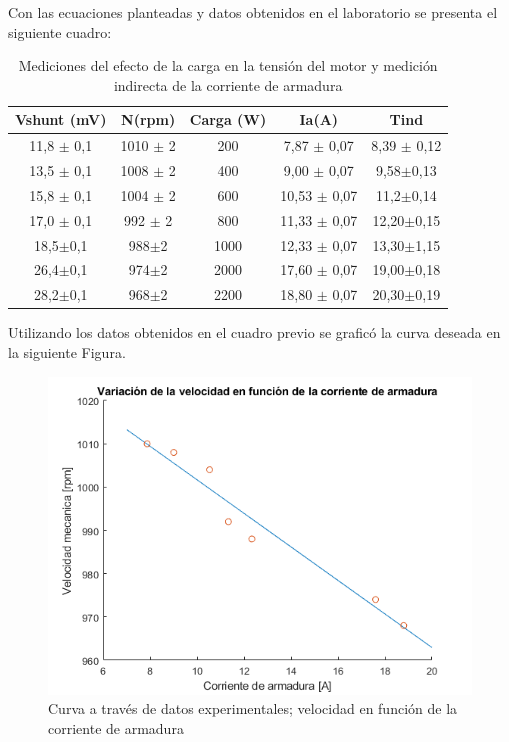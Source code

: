 \documentclass[11pt,letterpaper]{article}     %
\begin{document}
		Con las ecuaciones planteadas y datos obtenidos en el laboratorio se presenta el siguiente cuadro:
	\begin{table}[H]
		\centering
			\caption{Mediciones del efecto de la carga en la tensión del motor y medición indirecta de la corriente de armadura}
			\label{Cuadro valores de motor Iext ctte}
		\begin{tabular}{|c|c|c|c|c|}
			\hline
			Vshunt (mV) & N(rpm) & Carga (W) &Ia(A)& Tind\\ \hline
			11,8 $\pm$ 0,1 & 1010 $\pm$ 2 & 200 & 7,87 $\pm$ 0,07&8,39 $\pm$ 0,12\\ \hline
			13,5 $\pm$ 0,1 & 1008 $\pm$ 2 & 400 & 9,00 $\pm$ 0,07&9,58$\pm$0,13\\ \hline
			15,8 $\pm$ 0,1 & 1004 $\pm$ 2 & 600 & 10,53 $\pm$ 0,07&11,2$\pm$0,14\\ \hline
			17,0 $\pm$ 0,1 & 992 $\pm$ 2 & 800 & 11,33 $\pm$ 0,07& 12,20$\pm$0,15\\ \hline
			18,5$\pm$0,1 & 988$\pm$2 & 1000 & 12,33 $\pm$ 0,07& 13,30$\pm$1,15\\ \hline
			26,4$\pm$0,1 & 974$\pm$2 & 2000 & 17,60 $\pm$ 0,07&19,00$\pm$0,18\\ \hline
			28,2$\pm$0,1 & 968$\pm$2 & 2200 & 18,80 $\pm$ 0,07&20,30$\pm$0,19\\ \hline
		\end{tabular}
	\end{table}
Utilizando los datos obtenidos en el cuadro previo se graficó la curva deseada en la siguiente Figura.
	\begin{figure}[H]
	\centering
	\includegraphics[scale=0.8]{./recursos-Lab6/curvaVelocidadCorriente.png}
	\caption{Curva a través de datos experimentales; velocidad en función de la corriente de armadura}
	\label{fig:CurvaDeVelocidadCorriente}
\end{figure}
\end{document}
